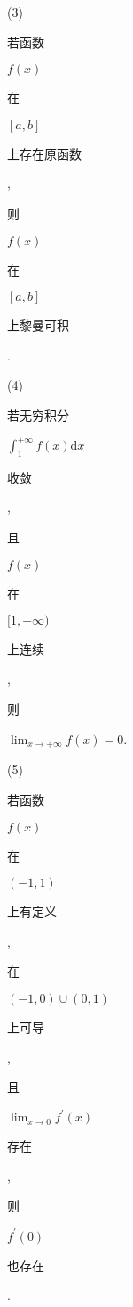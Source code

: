 \documentclass[10pt]{article}
\begin{document}
(3) \begin{CJK}{UTF8}{mj}若函数\end{CJK} $f(x)$ \begin{CJK}{UTF8}{mj}在\end{CJK} $[a, b]$ \begin{CJK}{UTF8}{mj}上存在原函数\end{CJK}, \begin{CJK}{UTF8}{mj}则\end{CJK} $f(x)$ \begin{CJK}{UTF8}{mj}在\end{CJK} $[a, b]$ \begin{CJK}{UTF8}{mj}上黎曼可积\end{CJK}.

(4) \begin{CJK}{UTF8}{mj}若无穷积分\end{CJK} $\int_{1}^{+\infty} f(x) \mathrm{d} x$ \begin{CJK}{UTF8}{mj}收敛\end{CJK}, \begin{CJK}{UTF8}{mj}且\end{CJK} $f(x)$ \begin{CJK}{UTF8}{mj}在\end{CJK} $[1,+\infty)$ \begin{CJK}{UTF8}{mj}上连续\end{CJK}, \begin{CJK}{UTF8}{mj}则\end{CJK} $\lim _{x \rightarrow+\infty} f(x)=0$.

(5) \begin{CJK}{UTF8}{mj}若函数\end{CJK} $f(x)$ \begin{CJK}{UTF8}{mj}在\end{CJK} $(-1,1)$ \begin{CJK}{UTF8}{mj}上有定义\end{CJK}, \begin{CJK}{UTF8}{mj}在\end{CJK} $(-1,0) \cup(0,1)$ \begin{CJK}{UTF8}{mj}上可导\end{CJK}, \begin{CJK}{UTF8}{mj}且\end{CJK} $\lim _{x \rightarrow 0} f^{\prime}(x)$ \begin{CJK}{UTF8}{mj}存在\end{CJK}, \begin{CJK}{UTF8}{mj}则\end{CJK} $f^{\prime}(0)$ \begin{CJK}{UTF8}{mj}也存在\end{CJK}.
\end{document}
